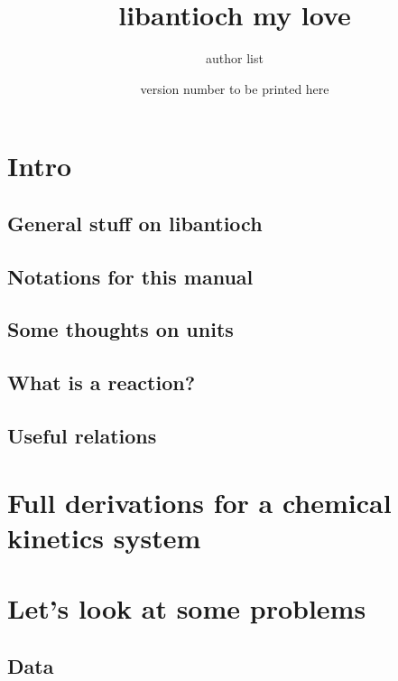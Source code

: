 \documentclass{article}
\begin{document}
\title{libantioch my love}
\date{version number to be printed here}
\author{author list}

\maketitle
\tableofcontents

\section{Intro}

\subsection{General stuff on libantioch}


\subsection{Notations for this manual}


\subsection{Some thoughts on units}
\label{units_in_Antioch}


\subsection{What is a reaction?}
\label{kinetics_gen}


\subsection{Useful relations}
\label{relations}


\section{Full derivations for a chemical kinetics system}
\label{derivations}


\section{Let's look at some problems}
\subsection{Data}

\end{document}

